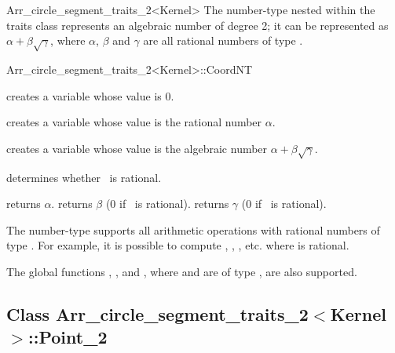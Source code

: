\begin{ccRefClass}{Arr_circle_segment_traits_2<Kernel>}
The  number-type nested within the traits class represents
an algebraic number of degree 2; it can be represented as
$\alpha + \beta\sqrt{\gamma}$, where $\alpha$, $\beta$ and $\gamma$ are
all rational numbers of type .

\begin{ccClass}{Arr_circle_segment_traits_2<Kernel>::CoordNT}

\ccTypes


\ccCreation
{}

    {creates a variable whose value is $0$.}

    {creates a variable whose value is the rational number $\alpha$.}

    {creates a variable whose value is the algebraic number 
     $\alpha + \beta\sqrt{\gamma}$.}

\ccAccessFunctions

  {determines whether \ccVar\ is rational.}

  {returns $\alpha$.}
\ccGlue
{}
  {returns $\beta$ (0 if \ccVar\ is rational).}
\ccGlue
{}
  {returns $\gamma$ (0 if \ccVar\ is rational).}


The  number-type supports all arithmetic operations with
rational numbers of type . For example, it is possible to
compute , , , etc. where  is rational.

The global functions , ,
 and , where  and
 are of type , are also supported.

\end{ccClass}

\subsection*{Class 
Arr\_circle\_segment\_traits\_2$<$Kernel$>$::Point\_2}


\end{ccRefClass}

